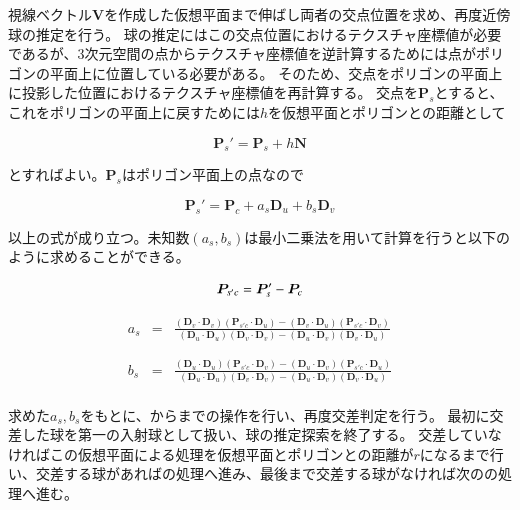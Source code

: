 視線ベクトル$\bm{V}$を作成した仮想平面まで伸ばし両者の交点位置を求め、再度近傍球の推定を行う。
球の推定にはこの交点位置におけるテクスチャ座標値が必要であるが、3次元空間の点からテクスチャ座標値を逆計算するためには点がポリゴンの平面上に位置している必要がある。
そのため、交点をポリゴンの平面上に投影した位置におけるテクスチャ座標値を再計算する。
交点を$\bm{P}_s$とすると、これをポリゴンの平面上に戻すためには$h$を仮想平面とポリゴンとの距離として

\begin{equation}
\bm{P}_s' = \bm{P}_s + h\bm{N}
\label{EPsdash}
\end{equation}

\noindent
とすればよい。$\bm{P}_s$はポリゴン平面上の点なので

\begin{equation}
\bm{P}_s' = \bm{P}_c + a_s\bm{D}_u + b_s\bm{D}_v 
\label{EPsdash2}
\end{equation}

\noindent
以上の式が成り立つ。未知数$(a_s, b_s)$は最小二乗法を用いて計算を行うと以下のように求めることができる。

\begin{equation}
\bm{P}_{s'c} = \bm{P}_s' - \bm{P}_c\\
\label{EPsdashc}
\end{equation}

\begin{eqnarray}
\label{Eas}
a_s &=& \frac{(\bm{D}_v \cdot \bm{D}_v)(\bm{P}_{s'c} \cdot \bm{D}_u) - (\bm{D}_v \cdot \bm{D}_u)(\bm{P}_{s'c} \cdot \bm{D}_v)}
{(\bm{D}_u \cdot \bm{D}_u)(\bm{D}_v \cdot \bm{D}_v) - (\bm{D}_u \cdot \bm{D}_v)(\bm{D}_v \cdot \bm{D}_u)}\\
\nonumber\\
\nonumber\\
\label{Ebs}
b_s &=& \frac{(\bm{D}_u \cdot \bm{D}_u)(\bm{P}_{s'c} \cdot \bm{D}_v) - (\bm{D}_u \cdot \bm{D}_v)(\bm{P}_{s'c} \cdot \bm{D}_u)}
{(\bm{D}_u \cdot \bm{D}_u)(\bm{D}_v \cdot \bm{D}_v) - (\bm{D}_u \cdot \bm{D}_v)(\bm{D}_v \cdot \bm{D}_u)}
\end{eqnarray}\\
\indent
求めた$a_s, b_s$をもとに、からまでの操作を行い、再度交差判定を行う。
最初に交差した球を第一の入射球として扱い、球の推定探索を終了する。
交差していなければこの仮想平面による処理を仮想平面とポリゴンとの距離が$r$になるまで行い、交差する球があればの処理へ進み、最後まで交差する球がなければ次のの処理へ進む。

